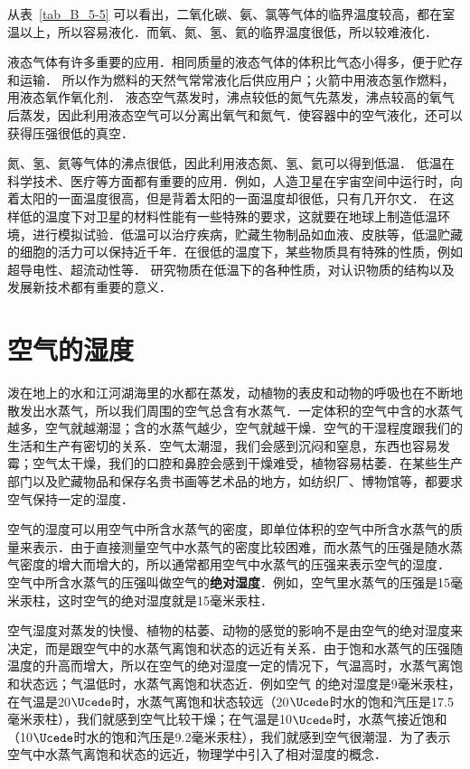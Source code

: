 从表~\ref{tab_B_5-5} 可以看出，二氧化碳、氨、氯等气体的临界温度较高，都在室温以上，所以容易液化．而氧、氮、氢、氦的临界温度很低，所以较难液化．

液态气体有许多重要的应用．相同质量的液态气体的体积比气态小得多，便于贮存和运输．
所以作为燃料的天然气常常液化后供应用户；火箭中用液态氢作燃料，用液态氧作氧化剂．
液态空气蒸发时，沸点较低的氮气先蒸发，沸点较高的氧气后蒸发，因此利用液态空气可以分离出氧气和氮气．使容器中的空气液化，还可以获得压强很低的真空．

氮、氢、氦等气体的沸点很低，因此利用液态氮、氢、氦可以得到低温．
低温在科学技术、医疗等方面都有重要的应用．例如，人造卫星在宇宙空间中运行时，向着太阳的一面温度很高，但是背着太阳的一面温度却很低，只有几开尔文．
在这样低的温度下对卫星的材料性能有一些特殊的要求，这就要在地球上制造低温环境，进行模拟试验．低温可以治疗疾病，贮藏生物制品如血液、皮肤等，低温贮藏的细胞的活力可以保持近千年．在很低的温度下，某些物质具有特殊的性质，例如超导电性、超流动性等．
研究物质在低温下的各种性质，对认识物质的结构以及发展新技术都有重要的意义．

\section{空气的湿度}
泼在地上的水和江河湖海里的水都在蒸发，动植物的表皮和动物的呼吸也在不断地散发出水蒸气，所以我们周围的空气总含有水蒸气．一定体积的空气中含的水蒸气越多，空气就越潮湿；含的水蒸气越少，空气就越干燥．空气的干湿程度跟我们的生活和生产有密切的关系．空气太潮湿，我们会感到沉闷和窒息，东西也容易发霉；空气太干燥，我们的口腔和鼻腔会感到干燥难受，植物容易枯萎．在某些生产部门以及贮藏物品和保存名贵书画等艺术品的地方，如纺织厂、博物馆等，都要求空气保持一定的湿度．

空气的湿度可以用空气中所含水蒸气的密度，即单位体积的空气中所含水蒸气的质量来表示．由于直接测量空气中水蒸气的密度比较困难，而水蒸气的压强是随水蒸气密度的增大而增大的，所以通常都用空气中水蒸气的压强来表示空气的湿度．
空气中所含水蒸气的压强叫做空气的\textbf{绝对湿度}．例如，空气里水蒸气的压强是15毫米汞柱，这时空气的绝对湿度就是15毫米汞柱．

空气湿度对蒸发的快慢、植物的枯萎、动物的感觉的影响不是由空气的绝对湿度来决定，而是跟空气中的水蒸气离饱和状态的远近有关系．由于饱和水蒸气的压强随温度的升高而增大，所以在空气的绝对湿度一定的情况下，气温高时，水蒸气离饱和状态远；气温低时，水蒸气离饱和状态近．例如空气
的绝对湿度是9毫米汞柱，在气温是20$\Ucede$时，水蒸气离饱和状态较远（20$\Ucede$时水的饱和汽压是17.5毫米汞柱），我们就感到空气比较干燥；在气温是10$\Ucede$时，水蒸气接近饱和（10$\Ucede$时水的饱和汽压是9.2毫米汞柱），我们就感到空气很潮湿．为了表示空气中水蒸气离饱和状态的远近，物理学中引入了相对湿度的概念．

